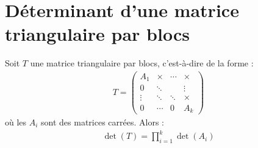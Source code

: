 \documentclass[../main.tex]{subfiles}
\begin{document}
\section{Déterminant d'une matrice triangulaire par blocs}
\begin{tcolorbox}[title=Propostion 30.52, title filled=false, colframe=lightblue, colback=lightblue!10!white]
    Soit $T$ une matrice triangulaire par blocs, c'est-à-dire de la forme : 
    \begin{align*}
        T = \begin{pmatrix}
            A_1 & \times & \cdots & \times \\
            0 & \ddots &  & \vdots \\
            \vdots & \ddots & \ddots & \times \\
            0 & \cdots & 0 & A_k
        \end{pmatrix}
    \end{align*}
    où les $A_i$ sont des matrices carrées. Alors : 
    \begin{align*}
        \operatorname{det}(T) = \prod_{i=1}^{k} \operatorname{det}(A_i)
    \end{align*}
\end{tcolorbox}
\end{document}
